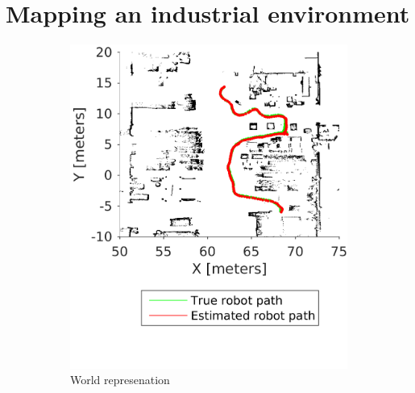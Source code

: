 \section{Mapping an industrial environment}
\label{mapping_simulation}

\begin{figure}
	\centering
	\begin{subfigure}[b]{0.45\textwidth}
		\includegraphics[width=\textwidth]{figures/static_mapping/simulated_robot_estimate_total}
		\caption{World represenation}
		\label{fig:simulated_robot_estimate_total}
	\end{subfigure}
	~ %
	\begin{subfigure}[b]{0.45\textwidth}

\end{subfigure}
\end{figure}
